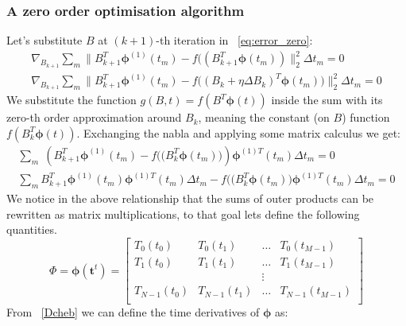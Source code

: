 \documentclass[11pt]{report}
\begin{document}
    \subsubsection{A zero order optimisation algorithm}
    Let's substitute $B$ at $(k+1)$-th iteration in ~\ref{eq:error_zero}:
    \begin{align}
        \nabla_{B_{k+1}} \sum_m \lVert
        B_{k+1}^T \pmb{\phi}^{(1)}(t_m)  -
        f ( (B_{k+1}^T \pmb\phi(t_m)  )
        \rVert^2_2
        \Delta t_m = 0 \\
        \nabla_{B_{k+1}}\sum_m \lVert
        B_{k+1}^T \pmb{\phi}^{(1)}(t_m)  -
        f \big( (B_{k} + \eta \Delta B_k)^T \pmb\phi(t_m)  \big)
        \rVert^2_2
        \Delta t_m = 0 \label{eq:B_inside_f}
    \end{align}
    We substitute the function $g(B, t) = f(B^T \pmb{\phi}(t) )$ inside the sum with its zero-th order
    approximation around $B_k$, meaning the constant (on $B$) function $f( B_k^T \pmb{\phi}(t) )$.
    Exchanging the nabla and applying some matrix calculus we get:
    \begin{align}
        \sum_m \;
        \left(
        B_{k+1}^T \pmb{\phi}^{(1)}(t_m)  -
        f \big( (B_{k}^T \pmb\phi(t_m)  \big)
        \right)
        \pmb{\phi}^{(1)T}(t_m)
        \Delta t_m = 0 \\
        \sum_m
        B_{k+1}^T \pmb{\phi}^{(1)}(t_m) \pmb{\phi}^{(1)T}(t_m) \Delta t_m-
        f \big( (B_{k}^T \pmb\phi(t_m)  \big) \pmb{\phi}^{(1)T}(t_m) \Delta t_m
        = 0
        \label{eq:grad_err}
    \end{align}
    We notice in the above relationship that the sums of outer products can be rewritten as matrix multiplications, to
    that goal lets define the following quantities.
    \begin{equation*}
        \Phi =  \pmb{\phi}(\pmb{t}^t)  =
        \begin{bmatrix}
            T_0(t_0)     & T_0(t_1)     & \dots & T_{0}(t_{M-1})   \\
            T_1(t_0)     & T_1(t_1)     & \dots & T_1(t_{M-1})     \\
            & & \vdots \\
            T_{N-1}(t_0) & T_{N-1}(t_1) & \dots & T_{N-1}(t_{M-1}) \\
        \end{bmatrix}\label{eq:cheb_mat}
    \end{equation*}
    From ~\eqref{Dcheb} we can define the time derivatives of $\pmb\phi$ as:
\end{document}

